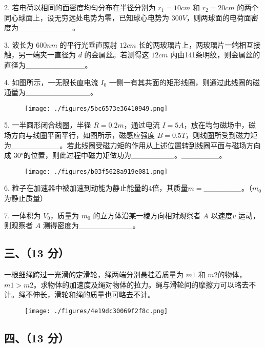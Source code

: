 2. 若电荷以相同的面密度均匀分布在半径分别为 $r_1=10cm$ 和 $r_2=20cm$ 的两个同心球面上，设无穷远处电势为零，已知球心电势为 $300V$，则两球面的电荷面密度为__________。

3. 波长为 $600nm$ 的平行光垂直照射 $12cm$ 长的两玻璃片上，两玻璃片一端相互接触，另一端夹一直径为 $d$ 的金属丝。若测得这 $12cm$ 内由141条明纹，则金属丝的直径为___________。

4. 如图所示，一无限长直电流 $I_0$ 一侧一有其共面的矩形线圈，则通过此线圈的磁通量为____________。
\begin{figure}[ht]
\centering
\texttt{[image: ./figures/5bc6573e36410949.png]}
\caption{} \label{fig_NJUD2_4}
\end{figure}
5. 一半圆形闭合线圈，半径 $R=0.2m$，通过电流 $I=5A$，放在均匀磁场中，磁场方向与线圈平面平行，如图所示，磁感应强度 $B=0.5T$，则线圈所受到磁力矩为_________。若此线圈受磁力矩的作用从上述位置转到线圈平面与磁场方向成 30°的位置，则此过程中磁力矩做功为________。_______。
\begin{figure}[ht]
\centering
\texttt{[image: ./figures/b03f5628a919e081.png]}
\caption{} \label{fig_NJUD2_5}
\end{figure}
6. 粒子在加速器中被加速到动能为静止能量的4倍，其质量$m=$_______。（$m_0$ 为静止质量）

7. 一体积为 $V_0$，质量为 $m_0$ 的立方体沿某一棱方向相对观察者 $A$ 以速度$v$ 运动，则观察者 $A$ 测得密度为__________。
\subsection{三、（13 分）}
一根细绳跨过一光滑的定滑轮，绳两端分别悬挂着质量为 $m1$ 和 $m2$的物体，$m1>m2$。求物体的加速度及绳对物体的拉力。绳与滑轮间的摩擦力可以略去不计。绳不伸长，滑轮和绳的质量也可略去不计。
\begin{figure}[ht]
\centering
\texttt{[image: ./figures/4e19dc30069f2f8c.png]}
\caption{} \label{fig_NJUD2_6}
\end{figure}
\subsection{四、（13 分）}
